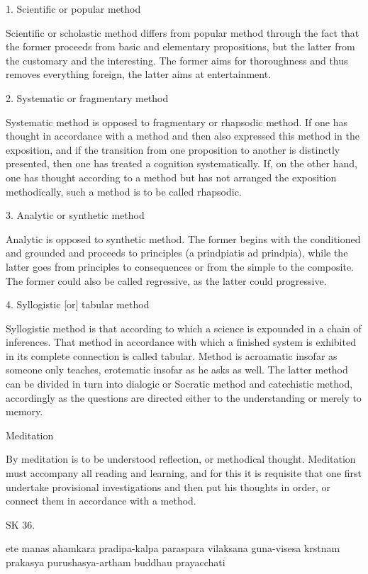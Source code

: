     1. Scientific or popular method

    Scientific or scholastic method differs from popular method through the
    fact that the former proceeds from basic and elementary propositions,
    but the latter from the customary and the interesting.
    The former aims for thoroughness and thus removes everything foreign,
    the latter aims at entertainment.

    2. Systematic or fragmentary method

    Systematic method is opposed to fragmentary or rhapsodic method.
    If one has thought in accordance with a method and then also expressed this
    method in the exposition, and if the transition from one proposition to
    another is distinctly presented, then one has treated a cognition systematically.
    If, on the other hand, one has thought according to a method but has
    not arranged the exposition methodically, such a method is to be called rhapsodic.

    3. Analytic or synthetic method

    Analytic is opposed to synthetic method.
    The former begins with the conditioned and grounded and
    proceeds to principles (a prindpiatis ad prindpia),
    while the latter goes from principles to consequences or
    from the simple to the composite.
    The former could also be called regressive,
    as the latter could progressive.

    4. Syllogistic [or] tabular method

    Syllogistic method is that according to which
    a science is expounded in a chain of inferences.
    That method in accordance with which a finished system is exhibited in
    its complete connection is called tabular.
    Method is acroamatic insofar as someone only teaches,
    erotematic insofar as he asks as well.
    The latter method can be divided in turn into dialogic or Socratic method and
    catechistic method, accordingly as the questions are
    directed either to the understanding or merely to memory.

    Meditation

    By meditation is to be understood reflection, or methodical thought.
    Meditation must accompany all reading and learning, and for this
    it is requisite that one first undertake provisional investigations and then
    put his thoughts in order, or connect them in accordance with a method.

SK 36.

ete manas ahamkara pradipa-kalpa paraspara vilaksana
guna-visesa krstnam prakasya purushasya-artham buddhau prayacchati

